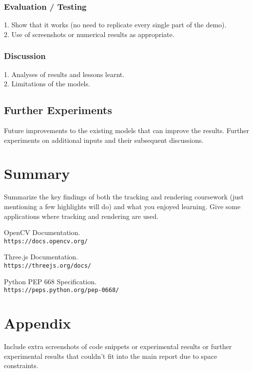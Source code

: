 \documentclass[10pt,twocolumn,letterpaper]{article}
\begin{document}
\subsubsection{Evaluation / Testing}
1. Show that it works (no need to replicate every single part of the demo). \\
2. Use of screenshots or numerical results as appropriate.

\subsubsection{Discussion}
1. Analyses of results and lessons learnt. \\
2. Limitations of the models.

\subsection{Further Experiments}
Future improvements to the existing models that can improve the results. Further experiments on additional inputs and their subsequent discussions.

\section{Summary}
Summarize the key findings of both the tracking and rendering coursework (just mentioning a few highlights will do) and what you enjoyed learning. Give some applications where tracking and rendering are used.

\begin{thebibliography}{9}

OpenCV Documentation. \\
\texttt{https://docs.opencv.org/}

Three.js Documentation. \\
\texttt{https://threejs.org/docs/}

Python PEP 668 Specification. \\
\texttt{https://peps.python.org/pep-0668/}

\end{thebibliography}

\appendix

\section{Appendix}
Include extra screenshots of code snippets or experimental results or further experimental results that couldn’t fit into the main report due to space constraints.
\end{document}
